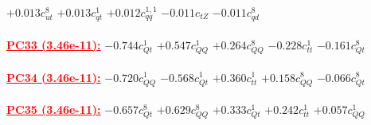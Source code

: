 \documentclass{article}
\begin{document}
{$+0.013$}{\rm $c_{ut}^{8}$} 
{$+0.013$}{\rm $c_{qt}^{1}$} 
{$+0.012$}{\rm $c_{qq}^{1,1}$} 
{$-0.011$}{\rm $c_{tZ}$} 
{$-0.011$}{\rm $c_{qd}^{8}$} 
 \nonumber \\ \nonumber \\ 
\noindent \textcolor{red}{\underline{\bf{PC33} (3.46e-11):}}
{$-0.744$}{\rm $c_{Qt}^{1}$} 
{$+0.547$}{\rm $c_{QQ}^{1}$} 
{$+0.264$}{\rm $c_{QQ}^{8}$} 
{$-0.228$}{\rm $c_{tt}^{1}$} 
{$-0.161$}{\rm $c_{Qt}^{8}$} 
 \nonumber \\ \nonumber \\ 
\noindent \textcolor{red}{\underline{\bf{PC34} (3.46e-11):}}
{$-0.720$}{\rm $c_{QQ}^{1}$} 
{$-0.568$}{\rm $c_{Qt}^{1}$} 
{$+0.360$}{\rm $c_{tt}^{1}$} 
{$+0.158$}{\rm $c_{QQ}^{8}$} 
{$-0.066$}{\rm $c_{Qt}^{8}$} 
 \nonumber \\ \nonumber \\ 
\noindent \textcolor{red}{\underline{\bf{PC35} (3.46e-11):}}
{$-0.657$}{\rm $c_{Qt}^{8}$} 
{$+0.629$}{\rm $c_{QQ}^{8}$} 
{$+0.333$}{\rm $c_{Qt}^{1}$} 
{$+0.242$}{\rm $c_{tt}^{1}$} 
{$+0.057$}{\rm $c_{QQ}^{1}$} 
 \nonumber \\ \nonumber \\ 
\end{document}
